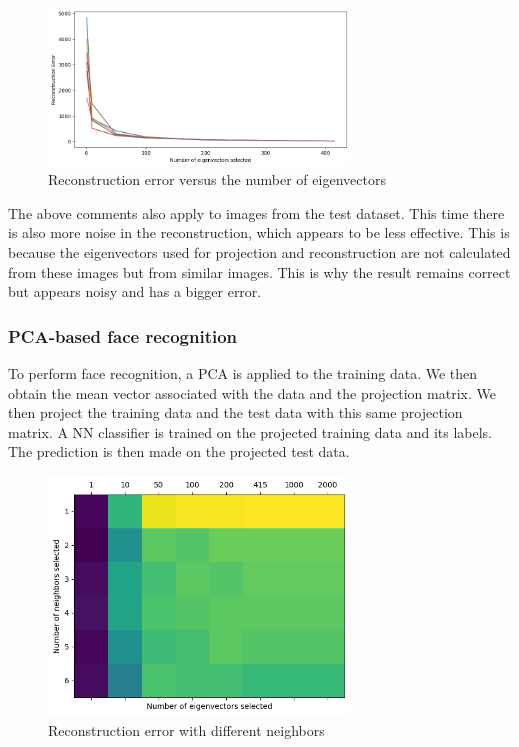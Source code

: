\begin{figure}[H]
	\centering
	\includegraphics[width=8.0cm]{./Ressources/Reconstruction_error.png}
	\caption{Reconstruction error versus the number of eigenvectors}
	\label{fig:rect_result}
\end{figure}

The above comments also apply to images from the test dataset. This time there is also more noise in the reconstruction, which appears to be less effective. This is because the eigenvectors used for projection and reconstruction are not calculated from these images but from similar images. This is why the result remains correct but appears noisy and has a bigger error.

\subsubsection{PCA-based face recognition}

To perform face recognition, a PCA is applied to the training data. We then obtain the mean vector associated with the data and the projection matrix. We then project the training data and the test data with this same projection matrix. A NN classifier is trained on the projected training data and its labels. The prediction is then made on the projected test data.

\begin{figure}[h]
	\centering
	\includegraphics[width=8.0cm]{./Ressources/matrix_neighbors_eigenvectors.png}
	\caption{Reconstruction error with different neighbors}
	\label{fig:knn_num}
\end{figure}

